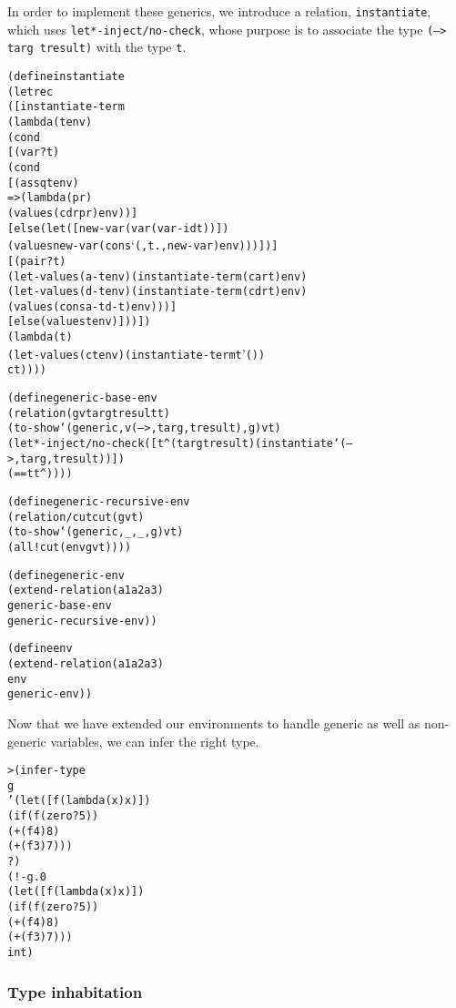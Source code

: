 In order to implement these generics, we introduce a relation,
\texttt{instantiate}, which uses \texttt{let*-inject/no-check}, whose purpose
is to associate the type \texttt{(--> targ tresult)} with the type
\texttt{t}.

\begin{alltt}
(define instantiate
  (letrec
      ([instantiate-term
         (lambda (t env)
           (cond
             [(var? t)
              (cond
                [(assq t env)
                 => (lambda (pr)
                      (values (cdr pr) env))]
                [else (let ([new-var (var (var-id t))])
                        (values new-var (cons `(,t . ,new-var) env)))])]
             [(pair? t)
              (let-values (a-t env) (instantiate-term (car t) env)
                (let-values (d-t env) (instantiate-term (cdr t) env)
                  (values (cons a-t d-t) env)))]
             [else (values t env)]))])
    (lambda (t)
      (let-values (ct env) (instantiate-term t '())
        ct))))
\end{alltt}

\begin{alltt}
(define generic-base-env
  (relation (g v targ tresult t)
    (to-show `(generic ,v (--> ,targ ,tresult) ,g) v t)
    (let*-inject/no-check ([t^ (targ tresult) (instantiate `(--> ,targ ,tresult))])
      (== t t^))))

(define generic-recursive-env
  (relation/cut cut (g v t)
    (to-show `(generic ,_ ,_ ,g) v t)
    (all! cut (env g v t))))

(define generic-env
  (extend-relation (a1 a2 a3)
    generic-base-env
    generic-recursive-env))

(define env
  (extend-relation (a1 a2 a3)
    env
    generic-env))
\end{alltt}

Now that we have extended our environments to handle generic
as well as non-generic variables, we can infer the right type.
\begin{alltt}
> (infer-type
    g
    '(let ([f (lambda (x) x)])
       (if (f (zero? 5))
         (+ (f 4) 8)
         (+ (f 3) 7)))
    ?)
(!- g.0
    (let ([f (lambda (x) x)])
      (if (f (zero? 5))
        (+ (f 4) 8)
        (+ (f 3) 7)))
    int)
\end{alltt}

\subsubsection{Type inhabitation}

